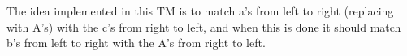 \documentclass[11pt]{article}
\begin{document}
\par The idea implemented in this TM is to match a's from left to right (replacing with A's) with the c's from right to left, and when this is done it should match b's from left to right with the A's from right to left. \\
\begin{figure}[h]
\centering
{}
\end{figure}
\newpage
\end{document}

